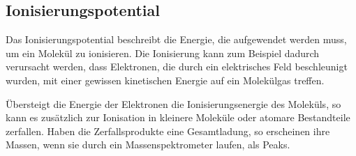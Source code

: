 \documentclass[10pt,a4paper]{article}
\begin{document}
\subsection{Ionisierungspotential}

Das Ionisierungspotential beschreibt die Energie, die aufgewendet werden muss, um ein Molekül zu ionisieren. Die Ionisierung kann zum Beispiel dadurch verursacht werden, dass Elektronen, die durch ein elektrisches Feld beschleunigt wurden, mit einer gewissen kinetischen Energie auf ein Molekülgas treffen.

Übersteigt die Energie der Elektronen die Ionisierungsenergie des Moleküls, so kann es zusätzlich zur Ionisation in kleinere Moleküle oder atomare Bestandteile zerfallen. Haben die Zerfallsprodukte eine Gesamtladung, so erscheinen ihre Massen, wenn sie durch ein Massenspektrometer laufen, als Peaks. 
\end{document}
